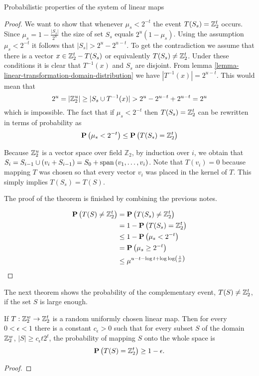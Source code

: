 \begin{section}{Probabilistic properties of the system of linear maps}
\begin{proof}
We want to show that whenever $\mu_s < 2^{-t}$ the event $T(S_s) = \mathbb{Z}_{2}^{t}$ occurs. Since $\mu_s = 1 - \frac{|S_s|}{2 ^ u}$ the size of set $S_s$ equals ${2 ^ u}(1 - \mu_s)$. Using the assumption $\mu_s < 2 ^ {-t}$ it follows that $|S_s| > 2^u - 2^{u - t}$. To get the contradiction we assume that there is a vector $x \in \mathbb{Z}_{2}^{t} - T(S_s)$ or equivalently $T(S_s) \neq \mathbb{Z}_{2}^{t}$. Under these conditions it is clear that $T ^ {-1}(x)$ and $S_s$ are disjoint. From lemma \ref{lemma-linear-transformation-domain-distribution} we have $|T ^ {-1}(x)| = 2 ^ {u - t}$. This would mean that
\[
2 ^ u = |\mathbb{Z}_{2}^{u}| \geq |S_s \cup T^{-1}(x)| > 2 ^ u - 2 ^ {u - t} + 2 ^ {u - t} = 2 ^u
\] which is impossible. The fact that if $\mu_s < 2^{-t}$ then $T(S_s) = \mathbb{Z}_{2}^{t}$ can be rewritten in terms of probability as
\[
	\mathbf{P}\left(\mu_s < 2^{-t}\right) \leq \mathbf{P}\left(T(S_s) = \mathbb{Z}_{2}^{t}\right)
\]

Because $\mathbb{Z}_{2}^{u}$ is a vector space over field $\mathbb{Z}_2$, by induction over $i$, we obtain that $S_i = S_{i - 1} \cup (v_i + S_{i - 1}) = S_0 + \mathrm{span}\left({v_1, \dots, v_i}\right)$. Note that $T(v_i) = 0$ because mapping $T$ was chosen so that every vector $v_i$ was placed in the kernel of $T$. This simply implies $T(S_s) = T(S)$.

The proof of the theorem is finished by combining the previous notes.

\[
\begin{split}
\mathbf{P}\left(T(S) \neq \mathbb{Z}_{2}^{t}\right) 
	& = \mathbf{P}\left(T(S_s) \neq \mathbb{Z}_{2}^{t}\right)  \\
	& = 1 - \mathbf{P}\left(T(S_s) = \mathbb{Z}_{2}^{t}\right) \\
	& \leq 1 - \mathbf{P}\left(\mu_s < 2 ^ {-t}\right) \\
	& = \mathbf{P}\left(\mu_s \geq 2 ^ {-t}\right) \\
	& \leq \mu ^ {u - t - \log t + \log \log \left(\frac{1}{\mu}\right)} \\
\end{split}
\]
\end{proof}

The next theorem shows the probability of the complementary event, $T(S) \neq \mathbb{Z}_{2}^{t}$, if the set $S$ is large enough.
\begin{theorem}
\label{theorem-set-onto-by-linear-transform}
If $T: \mathbb{Z}_{2}^{w} \rightarrow \mathbb{Z}_{2}^{t}$ is a random uniformly chosen linear map. Then for every $0 < \epsilon < 1$ there is a constant $c_\epsilon > 0$ such that for every subset $S$ of the domain $\mathbb{Z}_{2}^{w}$, $|S| \geq c_\epsilon t 2^t$, the probability of mapping $S$ onto the whole space is
\[
	\mathbf{P}\left(T(S) = \mathbb{Z}_{2}^{t}\right) \geq 1 - \epsilon \text{.}
\]
\end{theorem}
\begin{proof}

\end{proof}


\end{section}
